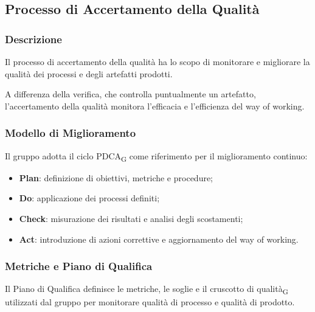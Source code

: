 
\subsection{Processo di Accertamento della Qualità}
\label{sec:qualita}

\subsubsection{Descrizione}

Il processo di accertamento della qualità ha lo scopo di monitorare e migliorare
la qualità dei processi e degli artefatti prodotti.

A differenza della verifica, che controlla puntualmente un artefatto, l'accertamento
della qualità monitora l'efficacia e l'efficienza del way of working.


\subsubsection{Modello di Miglioramento}

Il gruppo adotta il ciclo PDCA\textsubscript{G} come riferimento per il miglioramento
continuo:

\begin{itemize}
    \item \textbf{Plan}: definizione di obiettivi, metriche e procedure;
    \item \textbf{Do}: applicazione dei processi definiti;
    \item \textbf{Check}: misurazione dei risultati e analisi degli scostamenti;
    \item \textbf{Act}: introduzione di azioni correttive e aggiornamento del way of working.
\end{itemize}


\subsubsection{Metriche e Piano di Qualifica}

Il Piano di Qualifica definisce le metriche, le soglie e il cruscotto di qualità\textsubscript{G}
utilizzati dal gruppo per monitorare qualità di processo e qualità di prodotto.

